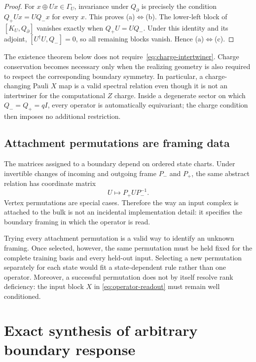 \documentclass[11pt]{article}
\numberwithin{equation}{section}
\theoremstyle{definition}
\theoremstyle{remark}
\begin{document}
\begin{proof}
For $x\oplus Ux\in\Gamma_U$, invariance under $Q_\partial$ is precisely the
condition $Q_+Ux=UQ_-x$ for every $x$.  This proves (a)$\Leftrightarrow$(b).
The lower-left block of $[K_U,Q_\partial]$ vanishes exactly when
$Q_+U=UQ_-$.  Under this identity and its adjoint,
$[U^\dagger U,Q_-]=0$, so all remaining blocks vanish.  Hence
(a)$\Leftrightarrow$(c).
\end{proof}

The existence theorem below does not require~\eqref{eq:charge-intertwiner}.
Charge conservation becomes necessary only when the realizing geometry is also
required to respect the corresponding boundary symmetry.  In particular, a
charge-changing Pauli $X$ map is a valid spectral relation even though it is
not an intertwiner for the computational $Z$ charge.  Inside a degenerate
sector on which $Q_-=Q_+=qI$, every operator is automatically equivariant; the
charge condition then imposes no additional restriction.

\subsection{Attachment permutations are framing data}

The matrices assigned to a boundary depend on ordered state charts.  Under
invertible changes of incoming and outgoing frame $P_-$ and $P_+$, the same
abstract relation has coordinate matrix
\begin{equation}
  U\longmapsto P_+UP_-^{-1}.
  \label{eq:frame-transform}
\end{equation}
Vertex permutations are special cases.  Therefore the way an input complex is
attached to the bulk is not an incidental implementation detail: it specifies
the boundary framing in which the operator is read.

Trying every attachment permutation is a valid way to identify an unknown
framing.  Once selected, however, the same permutation must be held fixed for
the complete training basis and every held-out input.  Selecting a new
permutation separately for each state would fit a state-dependent rule rather
than one operator.  Moreover, a successful permutation does not by itself
resolve rank deficiency: the input block $X$ in
\eqref{eq:operator-readout} must remain well conditioned.

\section{Exact synthesis of arbitrary boundary response}
\label{sec:synthesis}
\end{document}
